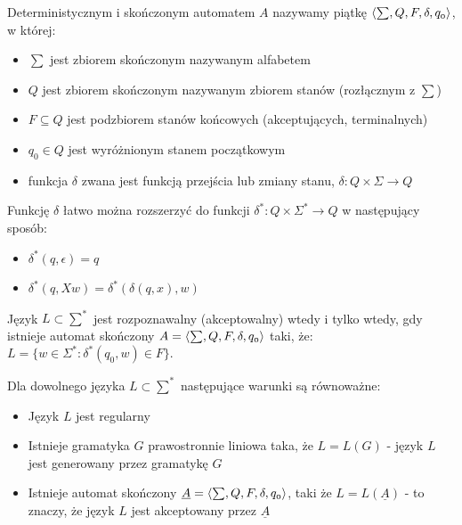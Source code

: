 \begin{pojecie}
	Deterministycznym i skończonym automatem $A$ nazywamy piątkę $\mathnormal{\langle \sum, Q, F, \delta, q_{0} \rangle}$, w której:
	\begin{itemize}
		\item $\sum$ jest zbiorem skończonym nazywanym alfabetem
		\item $Q$ jest zbiorem skończonym nazywanym zbiorem stanów (rozłącznym z $\sum$)
		\item $F \subseteq Q$ jest podzbiorem stanów końcowych (akceptujących, terminalnych)
		\item $q_{0} \in Q$ jest wyróżnionym stanem początkowym
		\item funkcja $\delta$ zwana jest funkcją przejścia lub zmiany stanu, $\delta: Q \times \Sigma \rightarrow Q$
	\end{itemize}
Funkcję $\delta$ łatwo można rozszerzyć do funkcji $\delta^{*}: Q \times \Sigma^{*} \rightarrow Q $ w następujący sposób:
\begin{itemize}
	\item $\delta^{*}(q,\epsilon) = q$
	\item $\delta^{*}(q, Xw) = \delta^{*}(\delta(q,x), w) $
\end{itemize}
\end{pojecie}


\begin{definicja}
	Język $L \subset \sum^{*}$ jest rozpoznawalny (akceptowalny) wtedy i tylko wtedy, gdy istnieje automat skończony 
	$ A = \mathnormal{\langle \sum, Q, F, \delta, q_{0} \rangle}$ taki, że: $L = \{ w \in \Sigma^{*} : \delta^{*}(q_{0}, w) \in F \} $.
\end{definicja}


\begin{twierdzenie}
	Dla dowolnego języka $L \subset \sum^{*}$ następujące warunki są równoważne:
	\begin{itemize}
		\item Język $L$ jest regularny
		\item Istnieje gramatyka $G$ prawostronnie liniowa taka, że $L = L (G) $ - język $L$ jest generowany przez gramatykę $G$
		\item Istnieje automat skończony $\underline{A} = \mathnormal{\langle \sum, Q, F, \delta, q_{0} \rangle}$,
		 taki że $L = L (\underline{A})$ - to znaczy, że język $L$ jest akceptowany przez $\underline{A}$
	\end{itemize}
\end{twierdzenie}

